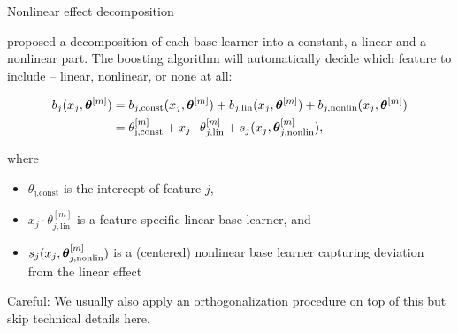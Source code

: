 \documentclass[11pt,compress,t,notes=noshow, xcolor=table]{beamer}
\begin{document}

%


\begin{vbframe}{Nonlinear effect decomposition}



proposed a decomposition of each base learner into a
constant, a linear and a nonlinear part.
The boosting algorithm will automatically decide which feature to include --
linear, nonlinear, or none at all:

\vspace{-0.7cm}

\begin{align*}
b_j(x_j, \bm{\theta}^{[m]}) & = b_{j, \text{const}}(x_j, \bm{\theta}^{[m]}) + b_{j, \text{lin}}
(x_j, \bm{\theta}^{[m]}) + b_{j, \text{nonlin}}(x_j, \bm{\theta}^{[m]})\\
 & = \theta^{[m]}_\text{j,const} + x_j \cdot \theta^{[m]}_{j, \text{lin}} +
 s_j(x_j, \bm{\theta}^{[m]}_{j,\text{nonlin}}),
\end{align*}

\small
where
\begin{itemize}
  \small
  \item $\theta_\text{j,const}$ is the intercept of feature $j$,
  \item $x_j \cdot \theta^{[m]}_{j, \text{lin}}$ is a feature-specific linear
  base learner, and
  \item $s_j(x_j, \bm{\theta}^{[m]}_{j,\text{nonlin}})$ is a (centered) nonlinear base
  learner capturing deviation from the linear effect 
\end{itemize}

Careful: We usually also apply an orthogonalization procedure on top of this but skip technical details here. 


\end{vbframe}
\end{document}
